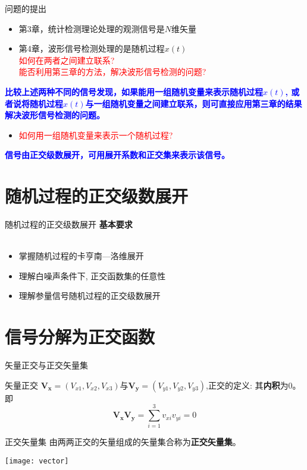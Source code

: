\begin{frame}{问题的提出}
\begin{itemize}
\item 第3章，统计检测理论处理的观测信号是$N$维矢量
\item 第4章，波形信号检测处理的是随机过程$x(t)$\\
\textcolor{red}{如何在两者之间建立联系?}\\
\textcolor{red}{能否利用第三章的方法，解决波形信号检测的问题?}
\end{itemize}
\pause
\textbf{\textcolor{blue}{比较上述两种不同的信号发现，如果能用一组随机变量来表示随机过程$x(t)$,  或者说将随机过程$x(t)$与一组随机变量之间建立联系，则可直接应用第三章的结果解决波形信号检测的问题。}}
\pause
\begin{itemize}
\item \textcolor{red}{如何用一组随机变量来表示一个随机过程?}
\end{itemize}
\pause
\textbf{\textcolor{blue}{信号由正交级数展开，可用展开系数和正交集来表示该信号。}}
\end{frame}

\section{随机过程的正交级数展开}

\begin{frame}{随机过程的正交级数展开}
\textbf{基本要求}\\
~\\
\begin{itemize}
	\setlength{\itemsep}{.5cm}
	\item 掌握随机过程的卡亨南---洛维展开
	\item 理解白噪声条件下, 正交函数集的任意性
	\item 理解参量信号随机过程的正交级数展开
\end{itemize}
\end{frame}

\section{信号分解为正交函数}

\begin{frame}{矢量正交与正交矢量集}
\begin{block}{矢量正交}
	$\bm{V_x}=(V_{x1},V_{x2},V_{x3})$与$\bm{V_y}=(V_{y1},V_{y2},V_{y3})$,正交的定义: 其\textbf{内积}为0。即
	\[\bm{V_xV_y}=\sum_{i=1}^{3}v_{xi}v_{yi}=0 \]
\end{block}
\begin{block}{正交矢量集}
	由两两正交的矢量组成的矢量集合称为\textbf{正交矢量集}。
\end{block}
\centering
\texttt{[image: vector]}
\end{frame}

